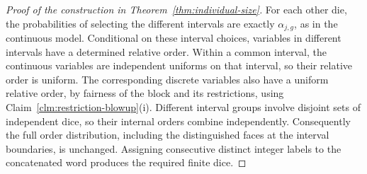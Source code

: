 \begin{proof}[Proof of the construction in Theorem~\ref{thm:individual-size}]
For each other die, the probabilities of selecting the different
intervals are exactly \(\alpha_{j,g}\), as in the continuous model.
Conditional on these interval choices, variables in different intervals
have a determined relative order.  Within a common interval, the
continuous variables are independent uniforms on that interval, so their
relative order is uniform.  The corresponding discrete variables also
have a uniform relative order, by fairness of the block and its
restrictions, using Claim~\ref{clm:restriction-blowup}(i).  Different
interval groups involve disjoint sets of independent dice, so their
internal orders combine independently.  Consequently the full order
distribution, including the distinguished faces at the interval
boundaries, is unchanged.  Assigning consecutive distinct integer labels
to the concatenated word produces the required finite dice.
\end{proof}
